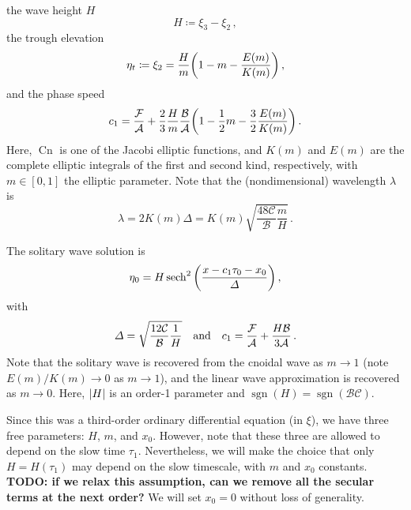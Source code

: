 \documentclass{jfm}
\DeclareMathOperator{\cn}{Cn}
\DeclareMathOperator{\sgn}{sgn}
\begin{document}
the wave height $H$
\begin{equation}
  H \coloneqq \xi_3 - \xi_2 \,,
\end{equation}
the trough elevation
\begin{equation}
  \eta_t \coloneqq \xi_2 = \frac{H}{m} \pqty{1 - m -\frac{E(m)}{K(m)}}
  \,,
\end{equation}
and the phase speed
\begin{equation}
  c_1 = \frac{\mathcal{F}}{\mathcal{A}} + \frac{2}{3} \frac{H}{m}
  \frac{\mathcal{B}}{\mathcal{A}} \pqty{1 - \frac{1}{2} m - \frac{3}{2}
     \frac{E(m)}{K(m)}} \,.
\end{equation}
Here, $\cn$ is one of the Jacobi elliptic functions, and $K(m)$ and
$E(m)$ are the complete elliptic integrals of the first and second kind,
respectively, with $m \in [0,1]$ the elliptic parameter.
Note that the (nondimensional) wavelength $\lambda$ is
\begin{equation}
  \lambda = 2 K(m) \Delta = K(m) \sqrt{\frac{48
  \mathcal{C}}{\mathcal{B}} \frac{m}{H}} \,.
  \label{eq:nondim_lambda}
\end{equation}

The solitary wave solution is
\begin{equation}
  \eta_0 = H \sech^2\pqty{\frac{x - c_1 \tau_0 - x_0}{\Delta}} \,,
\end{equation}
with
\begin{equation}
  \Delta = \sqrt{\frac{12 \mathcal{C}}{\mathcal{B}} \frac{1}{H}}
  \qq{and}
  c_1 = \frac{\mathcal{F}}{\mathcal{A}} + \frac{H \mathcal{B}}{3
    \mathcal{A}} \,.
\end{equation}
Note that the solitary wave is recovered from the cnoidal wave as $m \to
1$ (note $E(m)/K(m) \to 0$ as $m \to 1$), and the linear wave
approximation is recovered as $m \to 0$.
Here, $\abs{H}$ is an order-1 parameter and $\sgn(H) = \sgn(\mathcal{B}
\mathcal{C})$.

Since this was a third-order ordinary differential equation (in $\xi$),
we have three free parameters: $H$, $m$, and $x_0$.
However, note that these three are allowed to depend on the slow time
$\tau_1$.
Nevertheless, we will make the choice that only $H = H(\tau_1)$ may
depend on the slow timescale, with $m$ and $x_0$ constants.
\textbf{TODO: if we relax this assumption, can we remove all the secular
terms at the next order?}
We will set $x_0 = 0$ without loss of generality.
\end{document}
